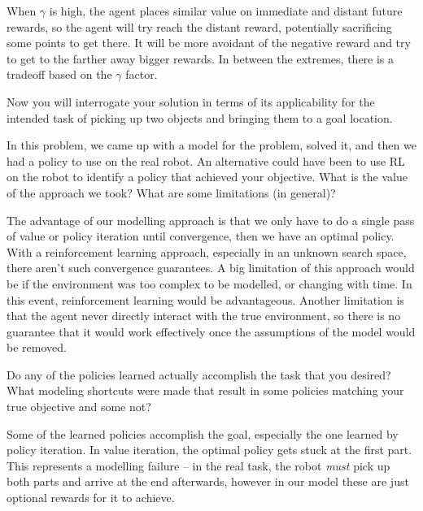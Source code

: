 \documentclass[expanded]{lkx_pset}
\begin{document}
\begin{solution}
	When $\gamma$ is high, the agent places similar value on immediate and distant future rewards, so the agent will try reach the distant reward, potentially sacrificing some points to get there. It will be more avoidant of the negative reward and try to get to the farther away bigger rewards. In between the extremes, there is a tradeoff based on the $\gamma$ factor.

	\begin{part}{}
		Now you will interrogate your solution in terms of its applicability
		for the intended task of picking up two objects and bringing them to a
		goal location.
	\end{part}

	\begin{part}{6} In this problem, we came up with a model for the problem,
		solved it, and then we had a policy to use on the real robot.  An
		alternative could have been to use RL on the robot to identify a
		policy that achieved your objective.  What is the value of the
		approach we took?  What are some limitations (in general)?
	\end{part}

	The advantage of our modelling approach is that we only have to do a single pass of value or policy iteration until convergence, then we have an optimal policy. With a reinforcement learning approach, especially in an unknown search space, there aren't such convergence guarantees. A big limitation of this approach would be if the environment was too complex to be modelled, or changing with time. In this event, reinforcement learning would be advantageous. Another limitation is that the agent never directly interact with the true environment, so there is no guarantee that it would work effectively once the assumptions of the model would be removed.


	\begin{part}{7} Do any of the policies learned actually accomplish the task
		that you desired?  What modeling shortcuts were made that result
		in some policies matching your true objective and some not?
	\end{part}

	Some of the learned policies accomplish the goal, especially the one learned by policy iteration. In value iteration, the optimal policy gets stuck at the first part. This represents a modelling failure -- in the real task, the robot  \emph{must} pick up both parts and arrive at the end afterwards, however in our model these are just optional rewards for it to achieve.



\end{solution}
\end{document}
